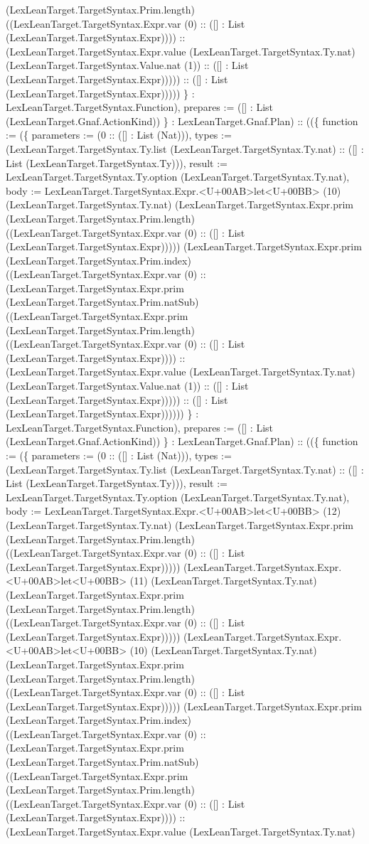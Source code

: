 \documentclass[11pt]{article}
\begin{document}
(LexLeanTarget.TargetSyntax.Prim.length) ((LexLeanTarget.TargetSyntax.Expr.var (0) :: ([] : List (LexLeanTarget.TargetSyntax.Expr)))) :: (LexLeanTarget.TargetSyntax.Expr.value (LexLeanTarget.TargetSyntax.Ty.nat) (LexLeanTarget.TargetSyntax.Value.nat (1)) :: ([] : List (LexLeanTarget.TargetSyntax.Expr))))) :: ([] : List (LexLeanTarget.TargetSyntax.Expr))))) \} : LexLeanTarget.TargetSyntax.Function), prepares := ([] : List (LexLeanTarget.Gnaf.ActionKind)) \} : LexLeanTarget.Gnaf.Plan) :: ((\{ function := (\{ parameters := (0 :: ([] : List (Nat))), types := (LexLeanTarget.TargetSyntax.Ty.list (LexLeanTarget.TargetSyntax.Ty.nat) :: ([] : List (LexLeanTarget.TargetSyntax.Ty))), result := LexLeanTarget.TargetSyntax.Ty.option (LexLeanTarget.TargetSyntax.Ty.nat), body := LexLeanTarget.TargetSyntax.Expr.<U+00AB>let<U+00BB> (10) (LexLeanTarget.TargetSyntax.Ty.nat) (LexLeanTarget.TargetSyntax.Expr.prim (LexLeanTarget.TargetSyntax.Prim.length) ((LexLeanTarget.TargetSyntax.Expr.var (0) :: ([] : List (LexLeanTarget.TargetSyntax.Expr))))) (LexLeanTarget.TargetSyntax.Expr.prim (LexLeanTarget.TargetSyntax.Prim.index) ((LexLeanTarget.TargetSyntax.Expr.var (0) :: (LexLeanTarget.TargetSyntax.Expr.prim (LexLeanTarget.TargetSyntax.Prim.natSub) ((LexLeanTarget.TargetSyntax.Expr.prim (LexLeanTarget.TargetSyntax.Prim.length) ((LexLeanTarget.TargetSyntax.Expr.var (0) :: ([] : List (LexLeanTarget.TargetSyntax.Expr)))) :: (LexLeanTarget.TargetSyntax.Expr.value (LexLeanTarget.TargetSyntax.Ty.nat) (LexLeanTarget.TargetSyntax.Value.nat (1)) :: ([] : List (LexLeanTarget.TargetSyntax.Expr))))) :: ([] : List (LexLeanTarget.TargetSyntax.Expr)))))) \} : LexLeanTarget.TargetSyntax.Function), prepares := ([] : List (LexLeanTarget.Gnaf.ActionKind)) \} : LexLeanTarget.Gnaf.Plan) :: ((\{ function := (\{ parameters := (0 :: ([] : List (Nat))), types := (LexLeanTarget.TargetSyntax.Ty.list (LexLeanTarget.TargetSyntax.Ty.nat) :: ([] : List (LexLeanTarget.TargetSyntax.Ty))), result := LexLeanTarget.TargetSyntax.Ty.option (LexLeanTarget.TargetSyntax.Ty.nat), body := LexLeanTarget.TargetSyntax.Expr.<U+00AB>let<U+00BB> (12) (LexLeanTarget.TargetSyntax.Ty.nat) (LexLeanTarget.TargetSyntax.Expr.prim (LexLeanTarget.TargetSyntax.Prim.length) ((LexLeanTarget.TargetSyntax.Expr.var (0) :: ([] : List (LexLeanTarget.TargetSyntax.Expr))))) (LexLeanTarget.TargetSyntax.Expr.<U+00AB>let<U+00BB> (11) (LexLeanTarget.TargetSyntax.Ty.nat) (LexLeanTarget.TargetSyntax.Expr.prim (LexLeanTarget.TargetSyntax.Prim.length) ((LexLeanTarget.TargetSyntax.Expr.var (0) :: ([] : List (LexLeanTarget.TargetSyntax.Expr))))) (LexLeanTarget.TargetSyntax.Expr.<U+00AB>let<U+00BB> (10) (LexLeanTarget.TargetSyntax.Ty.nat) (LexLeanTarget.TargetSyntax.Expr.prim (LexLeanTarget.TargetSyntax.Prim.length) ((LexLeanTarget.TargetSyntax.Expr.var (0) :: ([] : List (LexLeanTarget.TargetSyntax.Expr))))) (LexLeanTarget.TargetSyntax.Expr.prim (LexLeanTarget.TargetSyntax.Prim.index) ((LexLeanTarget.TargetSyntax.Expr.var (0) :: (LexLeanTarget.TargetSyntax.Expr.prim (LexLeanTarget.TargetSyntax.Prim.natSub) ((LexLeanTarget.TargetSyntax.Expr.prim (LexLeanTarget.TargetSyntax.Prim.length) ((LexLeanTarget.TargetSyntax.Expr.var (0) :: ([] : List (LexLeanTarget.TargetSyntax.Expr)))) :: (LexLeanTarget.TargetSyntax.Expr.value (LexLeanTarget.TargetSyntax.Ty.nat) 
\end{document}
